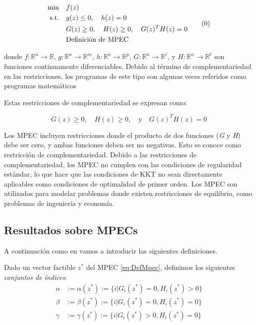 \begin{equation}
\begin{aligned}
\min \quad & f(z) \notag \\
\text{s.t.} \quad & g(z) \leq 0, \quad h(z) = 0 \\
& G(z) \geq 0, \quad H(z) \geq 0, \quad G(z)^T H(z) = 0 \notag\\
&\text{Definición de MPEC} \notag\\
\end{aligned}  
\tag{\theequation} 
\label{eq:DefMpec}
\end{equation}

donde $f: \mathbb{R}^n \to \mathbb{R}$, $g: \mathbb{R}^n \to \mathbb{R}^m$, $h: \mathbb{R}^n \to \mathbb{R}^p$, $G: \mathbb{R}^n \to \mathbb{R}^\ell$, y $H: \mathbb{R}^n \to \mathbb{R}^\ell$ son funciones continuamente diferenciables. Debido al término de complementariedad en las restricciones, los programas de este tipo son algunas veces referidos como programas matemáticos

Estas restricciones de complementariedad se expresan como: 

\begin{equation}
    G(z) \geq 0, \quad H(z) \geq 0, \quad \text{y} \quad G(z)^T H(z) = 0 \label{eq:RestriccionesComplementariedadAbstracto}
\end{equation}

Los MPEC incluyen restricciones donde el producto de dos funciones (\textit{G} y \textit{H}) debe ser cero, y ambas funciones deben ser no negativas. Esto se conoce como restricción de complementariedad. Debido a las restricciones de complementariedad, los MPEC no cumplen con las condiciones de regularidad estándar, lo que hace que las condiciones de KKT no sean directamente aplicables como condiciones de optimalidad de primer orden. Los MPEC son utilizados para modelar problemas donde existen restricciones de equilibrio, como problemas de ingeniería y economía.

\subsection{Resultados sobre MPECs}

A continuación como en \cite{Flegel2003AFJ} vamos a  introducir las siguientes definiciones.
\begin{definition}
Dado un vector factible $z^*$ del MPEC \eqref{eq:DefMpec}, definimos los siguientes \textit{conjuntos de índices}:
\begin{equation}
\begin{aligned}
\alpha &:= \alpha(z^*) := \{i|G_i(z^*) = 0, H_i(z^*) > 0\} \\
\beta &:= \beta(z^*) := \{i|G_i(z^*) = 0, H_i(z^*) = 0\}  \\
\gamma &:= \gamma(z^*) := \{i|G_i(z^*) > 0, H_i(z^*) = 0\}  \\
\end{aligned}
\label{eq:ConjuntoDeIndices} 
\end{equation}
\end{definition}

